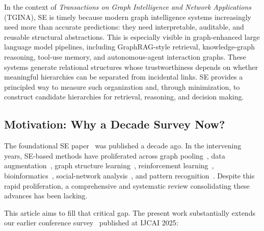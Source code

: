 In the context of \emph{Transactions on Graph Intelligence and Network
Applications} (TGINA), SE is timely because modern graph intelligence systems
increasingly need more than accurate predictions: they need interpretable,
auditable, and reusable structural abstractions.
This is especially visible in graph-enhanced large language model pipelines,
including GraphRAG-style retrieval, knowledge-graph reasoning, tool-use
memory, and autonomous-agent interaction graphs.
These systems generate relational structures whose trustworthiness depends on
whether meaningful hierarchies can be separated from incidental links.
SE provides a principled way to measure such organization and, through
minimization, to construct candidate hierarchies for retrieval, reasoning, and
decision making.

\subsection*{Motivation: Why a Decade Survey Now?}

The foundational SE paper~\cite{Li2016} was published a decade ago.
In the intervening years, SE-based methods have proliferated across graph
pooling~\cite{wu2022pooling,wxb2024hi-part}, data
augmentation~\cite{wu2023sega,wang2023user}, graph structure
learning~\cite{zou2023segsl,duan2024structuralGSL}, reinforcement
learning~\cite{zeng2025sidmJMLR,zeng2023hierarchicalSISA,zeng2024effectiveSI2E},
bioinformatics~\cite{zhang2021supertad,chen2022pyseat,li2023dedoc2},
social-network analysis~\cite{peng2024zjyun,yang2024sebot,cao2024socialevent},
and pattern recognition~\cite{zhu2023HiTIN,zeng2023lesion,wang2024secodecSpeech}.
Despite this rapid proliferation, a comprehensive and systematic review
consolidating these advances has been lacking.

This article aims to fill that critical gap.
The present work substantially extends our earlier conference
survey~\cite{su2025ijcai} published at IJCAI 2025:

